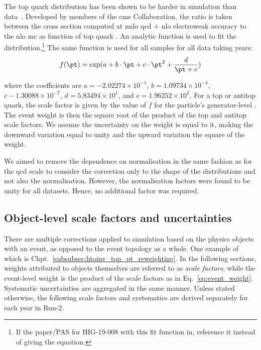 The top quark \pt distribution has been shown to be harder in simulation than data~\cite{Sirunyan:2018ucr}. Developed by members of the \acrshort{cms} Collaboration, the ratio is taken between the \ttbar cross section computed at \acrshort{nnlo} \acrshort{qcd} $+$ \acrshort{nlo} electroweak accuracy to the \acrshort{nlo} \POWHEG \acrshort{mc} as function of top quark \pt. An analytic function is used to fit the distribution.\footnote{If the paper/PAS for HIG-19-008 with this fit function in, reference it instead of giving the equation.} The same function is used for all \ttbarpjets samples for all data taking years:
\begin{equation}
    f(\pt) = \exp(a + b \cdot \pt + c \cdot \pt^2 + \frac{d}{\pt + e})
\end{equation}

where the coefficients are $a = -2.02274 \times 10^{-1}$, $b = 1.09734 \times 10^{-4}$, $c -1.30088 \times 10^{-7}$, $d = 5.83494 \times 10^1$, and $e = 1.96252 \times 10^2$. For a top or antitop quark, the scale factor is given by the value of $f$ for the particle's generator-level \pt. The event weight is then the square root of the product of the top and antitop scale factors. We assume the uncertainty on the weight is equal to it, making the downward variation equal to unity and the upward variation the square of the weight.

We aimed to remove the dependence on normalisation in the same fashion as for the \acrshort{qcd} scale to consider the correction only to the shape of the distributions and not also the normalisation. However, the normalisation factors were found to be unity for all datasets. Hence, no additional factor was required.





\subsection{Object-level scale factors and uncertainties}
\label{subsec:htoinv_SFs_systs_objects}

There are multiple corrections applied to simulation based on the physics objects with an event, as opposed to the event topology as a whole. One example of which is Chpt.~\ref{subsubsec:htoinv_top_pt_reweighting}. In the following sections, weights attributed to objects themselves are referred to as \emph{scale factors}, while the event-level weight is the product of the scale factors as in Eq.~\ref{eq:event_weight}. Systematic uncertainties are aggregated in the same manner. Unless stated otherwise, the following scale factors and systematics are derived separately for each year in Run-2.


